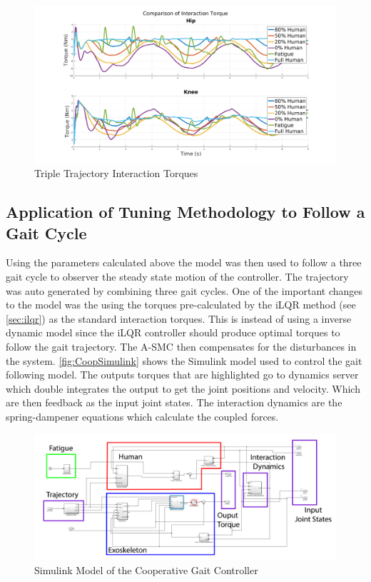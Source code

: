 \begin{figure}
    \centering
    \includegraphics[width=\columnwidth]{images/controllers/trajs/interactions.png}
    \caption[Triple Trajectory Interaction Torques]{Triple Trajectory Interaction Torques}
    \label{fig:InteractionTripleTraj}
\end{figure}


\subsection{Application of Tuning Methodology to Follow a Gait Cycle}


Using the parameters calculated above the model was then used to follow a three gait cycle to observer the steady state motion of the controller. The trajectory was auto generated by combining three gait cycles.  One of the important changes to the model was the using the torques pre-calculated  by the iLQR method (see \autoref{sec:ilqr}) as the standard interaction torques.  This is instead of using a inverse dynamic model since the iLQR controller should produce optimal torques to follow the gait trajectory. The A-SMC then compensates for the disturbances in the system. \autoref{fig:CoopSimulink} shows the Simulink model used to control the gait following model. The outputs torques that are highlighted go to dynamics server which double integrates the output to get the joint positions and velocity. Which are then feedback as the input joint states. The interaction dynamics are the spring-dampener equations which calculate the coupled forces.  



\begin{figure}[h!]
    \centering
    \includegraphics[width=\columnwidth]{images/controllers/upper_model_simulink_edit.png}
    \caption[Simulink Model Cooperative Controller]{Simulink Model of the Cooperative Gait Controller }
    \label{fig:CoopSimulink}
\end{figure}


